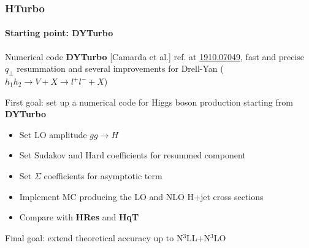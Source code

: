 \documentclass[aspectratio=43]{beamer}
\begin{document}
\begin{frame}

	\frametitle{HTurbo}
	\framesubtitle{Starting point: DYTurbo}

	\footnotesize
	
	Numerical code \textbf{DYTurbo} {\color{blue}[Camarda et al.]} ref. at {\color{blue} \href{https://arxiv.org/abs/1910.07049}{1910.07049}}, fast and precise $q_{\perp}$ resummation and several improvements for Drell-Yan ($h_{1}h_{2} \rightarrow V + X \rightarrow l^{+}l^{-} + X$) 
	
	\vspace{0.5 cm}
	
	{\color{red}First goal}: set up a numerical code for Higgs boson production starting from  \textbf{DYTurbo}
 
	\begin{itemize}
		\item Set LO amplitude $gg \rightarrow H$
		\item Set Sudakov and Hard coefficients for resummed component
		\item Set $\Sigma$ coefficients for asymptotic term
		\item Implement MC producing the LO and NLO H+jet cross sections
		\item Compare with \textbf{HRes} and \textbf{HqT}
	\end{itemize}

	\vspace{0.2 cm}

	{\color{red}Final goal}: extend theoretical accuracy up to N$^{3}$LL+N$^{3}$LO

\end{frame}
\end{document}
